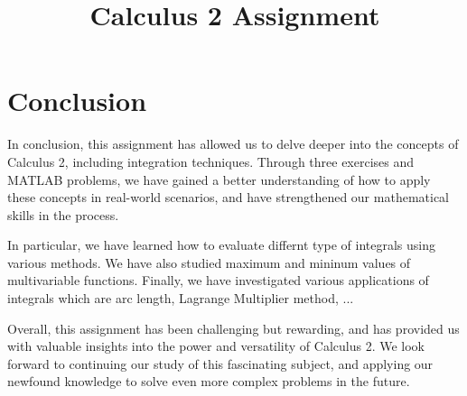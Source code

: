 \documentclass[twoside]{hcmut-report}
\title{Calculus 2 Assignment}
\begin{document}
\coverpage%

\tableofcontents
\clearpage







\clearpage

\section*{Conclusion}
In conclusion, this assignment has allowed us to delve deeper into the concepts of Calculus 2, including integration techniques. Through three exercises and 
MATLAB problems, we have gained a better understanding of how to apply these concepts in real-world scenarios, and have strengthened our mathematical skills in the process.

In particular, we have learned how to evaluate differnt type of integrals using various methods. We have also studied maximum and mininum values of multivariable functions. Finally, we have investigated various applications of integrals which are arc length, Lagrange Multiplier method, ...

Overall, this assignment has been challenging but rewarding, and has provided us with valuable insights into the power and versatility of Calculus 2. We look forward to continuing our study of this fascinating subject, and applying our newfound knowledge to solve even more complex problems in the future.



\nocite{*}
\end{document}
